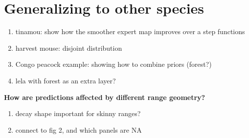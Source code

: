 \section{Generalizing to other species}%


\begin{enumerate}
  \item tinamou: show how  the smoother expert map improves over a step functions
  \item harvest mouse: disjoint distribution
  \item Congo peacock example: showing how to combine priors (forest?)
  \item lela with forest as an extra layer?
\end{enumerate}


\textbf{How are predictions affected by different range geometry?} 

\begin{enumerate}
  \item decay shape important for skinny ranges?
  \item connect to fig 2, and which panels are NA
\end{enumerate}
